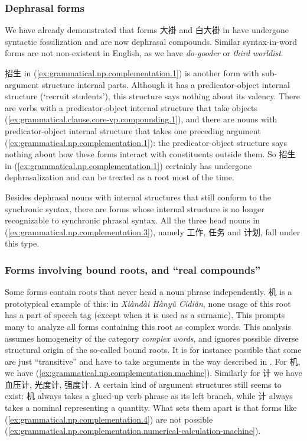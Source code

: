 \documentclass[UTF8, a4paper, oneside, scheme=plain, 12pt]{ctexrep}
\newcommand*{\term}[1]{\emph{#1}}
\newcommand{\form}[1]{\emph{#1}}
\newcommand{\work}[1]{\textit{#1}}
\newcommand{\translate}[1]{`#1'}
\begin{document}
\subsubsection{Dephrasal forms}

We have already demonstrated that forms 大褂 and 白大褂 in 
have undergone syntactic fossilization and are now dephrasal compounds.
Similar syntax-in-word forms are not non-existent in English,
as we have \form{do-gooder} or \form{third worldist}.

招生 in (\ref{ex:grammatical.np.complementation.1}) is another form with sub-argument structure internal parts.
Although it has a predicator-object internal structure (\translate{recruit students}),
this structure says nothing about its valency.
There are verbs with a predicator-object internal structure
that take objects (\ref{ex:grammatical.clause.core-vp.compounding.1}),
and there are nouns with predicator-object internal structure 
that takes one preceding argument (\ref{ex:grammatical.np.complementation.1}):
the predicator-object structure says nothing about how these forms
interact with constituents outside them.
So 招生 in (\ref{ex:grammatical.np.complementation.1})
certainly has undergone dephrasalization and
can be treated as a root most of the time.

Besides dephrasal nouns with internal structures that still conform to the synchronic syntax,
there are forms whose internal structure is no longer recognizable
to synchronic phrasal syntax.
All the three head nouns in (\ref{ex:grammatical.np.complementation.3}),
namely 工作, 任务 and 计划, fall under this type.

\subsubsection{Forms involving bound roots, and ``real compounds''}\label{sec:grammatical.np.derivation.compounding}

Some forms contain roots that never head a noun phrase independently.
机 is a prototypical example of this:
in \work{Xiàndài Hànyǔ Cídiǎn}, none usage of this root has a part of speech tag
(except when it is used as a surname).
This prompts many to analyze all forms containing this root as complex words.
This analysis assumes homogeneity of the category \term{complex words},
and ignores possible diverse structural origin of the so-called bound roots.
It is for instance possible that some are just ``transitive'' and have to take arguments
in the way described in .
For 机, we have (\ref{ex:grammatical.np.complementation.machine}).
Similarly for 计 we have 血压计, 光度计, 强度计.
A certain kind of argument structures still seems to exist:
机 always takes a glued-up verb phrase as its left branch,
while 计 always takes a nominal representing a quantity.
What sets them apart is that forms like (\ref{ex:grammatical.np.complementation.4}) are not possible
(\ref{ex:grammatical.np.complementation.numerical-calculation-machine}).
\end{document}
